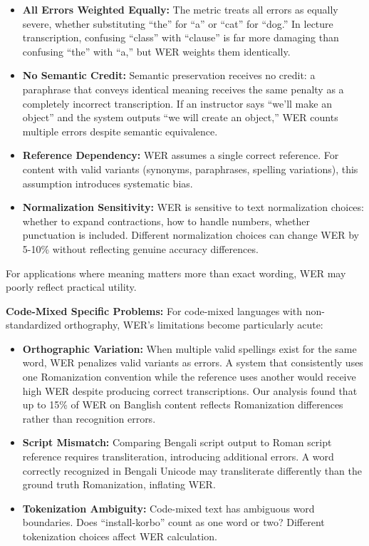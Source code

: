\begin{itemize}
    \item \textbf{All Errors Weighted Equally:} The metric treats all errors as equally severe, whether substituting ``the'' for ``a'' or ``cat'' for ``dog.'' In lecture transcription, confusing ``class'' with ``clause'' is far more damaging than confusing ``the'' with ``a,'' but WER weights them identically.
    
    \item \textbf{No Semantic Credit:} Semantic preservation receives no credit: a paraphrase that conveys identical meaning receives the same penalty as a completely incorrect transcription. If an instructor says ``we'll make an object'' and the system outputs ``we will create an object,'' WER counts multiple errors despite semantic equivalence.
    
    \item \textbf{Reference Dependency:} WER assumes a single correct reference. For content with valid variants (synonyms, paraphrases, spelling variations), this assumption introduces systematic bias.
    
    \item \textbf{Normalization Sensitivity:} WER is sensitive to text normalization choices: whether to expand contractions, how to handle numbers, whether punctuation is included. Different normalization choices can change WER by 5-10\% without reflecting genuine accuracy differences.
\end{itemize}

For applications where meaning matters more than exact wording, WER may poorly reflect practical utility.

\textbf{Code-Mixed Specific Problems:} For code-mixed languages with non-standardized orthography, WER's limitations become particularly acute:

\begin{itemize}
    \item \textbf{Orthographic Variation:} When multiple valid spellings exist for the same word, WER penalizes valid variants as errors. A system that consistently uses one Romanization convention while the reference uses another would receive high WER despite producing correct transcriptions. Our analysis found that up to 15\% of WER on Banglish content reflects Romanization differences rather than recognition errors.
    
    \item \textbf{Script Mismatch:} Comparing Bengali script output to Roman script reference requires transliteration, introducing additional errors. A word correctly recognized in Bengali Unicode may transliterate differently than the ground truth Romanization, inflating WER.
    
    \item \textbf{Tokenization Ambiguity:} Code-mixed text has ambiguous word boundaries. Does ``install-korbo'' count as one word or two? Different tokenization choices affect WER calculation.
\end{itemize}

